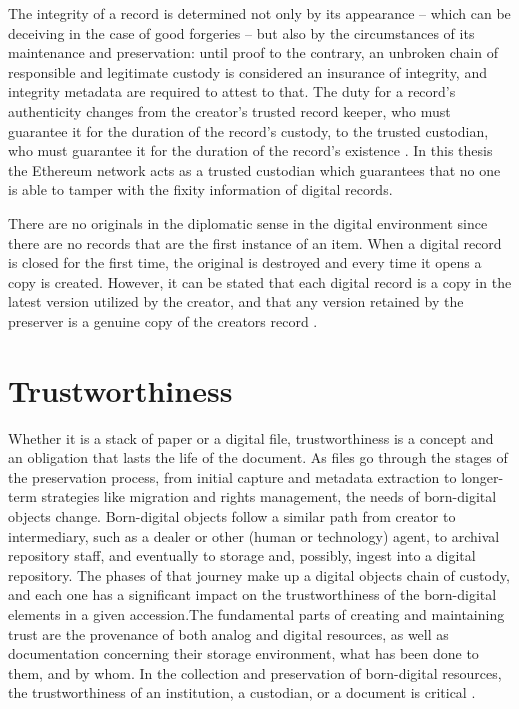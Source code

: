 The integrity of a record is determined not only by its appearance – which can be deceiving in the case of good forgeries – but also by the circumstances of its maintenance and preservation: until proof to the contrary, an unbroken chain of responsible and legitimate custody is considered an insurance of integrity, and integrity metadata are required to attest to that. The duty for a record's authenticity changes from the creator's trusted record keeper, who must guarantee it for the duration of the record's custody, to the trusted custodian, who must guarantee it for the duration of the record's existence \cite[53]{duranti2009digital}. In this thesis the Ethereum network acts as a trusted custodian which guarantees that no one is able to tamper with the fixity information of digital records.

There are no originals in the diplomatic sense in the digital environment since there are no records that are the first instance of an item. When a digital record is closed for the first time, the original is destroyed and every time it opens a copy is created. However, it can be stated that each digital record is a copy in the latest version utilized by the creator, and that any version retained by the preserver is a genuine copy of the creators record \cite[58]{duranti2009digital}.

\section{Trustworthiness}
Whether it is a stack of paper or a digital file, trustworthiness is a concept and an obligation that lasts the life of the document. As files go through the stages of the preservation process, from initial capture and metadata extraction to longer-term strategies like migration and rights management, the needs of born-digital objects change. Born-digital objects follow a similar path from creator to intermediary, such as a dealer or other (human or technology) agent, to archival repository staff, and eventually to storage and, possibly, ingest into a digital repository. The phases of that journey make up a digital objects chain of custody, and each one has a significant impact on the trustworthiness of the born-digital elements in a given accession.\newline The fundamental parts of creating and maintaining trust are the provenance of both analog and digital resources, as well as documentation concerning their storage environment, what has been done to them, and by whom. In the collection and preservation of born-digital resources, the trustworthiness of an institution, a custodian, or a document is critical \cite[27]{kirschenbaum2010digital}. 

